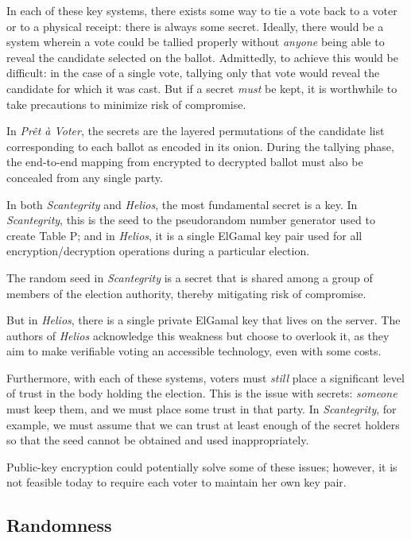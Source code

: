 \documentclass[10pt,twocolumn]{article}
\newcommand{\term}[1]{\textit{#1}}
\newcommand{\preta}{Pr\^{e}t \`{a}}
\newcommand{\pv}{\preta{} Voter}
\begin{document}
In each of these key systems, there exists some way to tie a vote back to a voter or to a physical
receipt: there is always some secret. Ideally, there would be a system wherein a vote could be
tallied properly without \emph{anyone} being able to reveal the candidate selected on the ballot.
Admittedly, to achieve this would be difficult: in the case of a single vote, tallying only that vote
would reveal the candidate for which it was cast. But if a secret \emph{must} be kept, it is
worthwhile to take precautions to minimize risk of compromise.

In \term{\pv{}}, the secrets are the layered permutations of the candidate list corresponding to each ballot as encoded in its onion.
During the tallying phase, the end-to-end mapping from encrypted to decrypted ballot must also be concealed from any single party.

In both \term{Scantegrity} and \term{Helios}, the most fundamental secret is a key. In \term{Scantegrity}, this is the
seed to the pseudorandom number generator used to create Table P; and in \term{Helios}, it is a single
ElGamal key pair used for all encryption/decryption operations during a particular election.

The random seed in \term{Scantegrity} is a secret that is shared among a group of members of the election
authority, thereby mitigating risk of compromise.

But in \term{Helios}, there is a single private ElGamal key that lives on the server. The
authors of \term{Helios} acknowledge this weakness but choose to overlook it, as they aim to make
verifiable voting an accessible technology, even with some costs.

Furthermore, with each of these systems, voters must \emph{still} place a significant level of trust
in the body holding the election. This is the issue with secrets: \emph{someone} must keep them, and
we must place some trust in that party. In \term{Scantegrity}, for example, we must assume that we can
trust at least enough of the secret holders so that the seed cannot be obtained and used
inappropriately.

Public-key encryption could potentially solve some of these issues; however, it is not feasible
today to require each voter to maintain her own key pair.

\subsection{Randomness}
\end{document}
